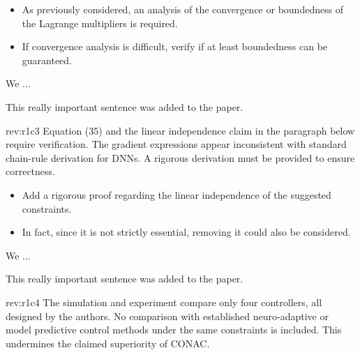 \documentclass[12pt,english]{reviewresponse}
\begin{document}
\begin{howtoanswer}
    \begin{itemize}
        \item As previously considered, an analysis of the convergence or boundedness of the Lagrange multipliers is required.
        \item If convergence analysis is difficult, verify if at least boundedness can be guaranteed.
    \end{itemize}   
\end{howtoanswer}

\begin{revresponse}
    We ...
    \begin{changes}
        This really important sentence was added to the paper.
    \end{changes}
\end{revresponse}

\begin{revcomment}[2]{rev:r1c3}
    Equation (35) and the linear independence claim in the paragraph below require verification. The gradient expressions appear inconsistent with standard chain-rule derivation for DNNs. A rigorous derivation must be provided to ensure correctness.
\end{revcomment}

\begin{howtoanswer}
    \begin{itemize}
        \item Add a rigorous proof regarding the linear independence of the suggested constraints.
        \item In fact, since it is not strictly essential, removing it could also be considered.
    \end{itemize}
\end{howtoanswer}

\begin{revresponse}
    We ...
    \begin{changes}
        This really important sentence was added to the paper.
    \end{changes}
\end{revresponse}

\begin{revcomment}[1]{rev:r1c4}
    The simulation and experiment compare only four controllers, all designed by the authors. No comparison with established neuro-adaptive or model predictive control methods under the same constraints is included. This undermines the claimed superiority of CONAC.
\end{revcomment}
\end{document}

